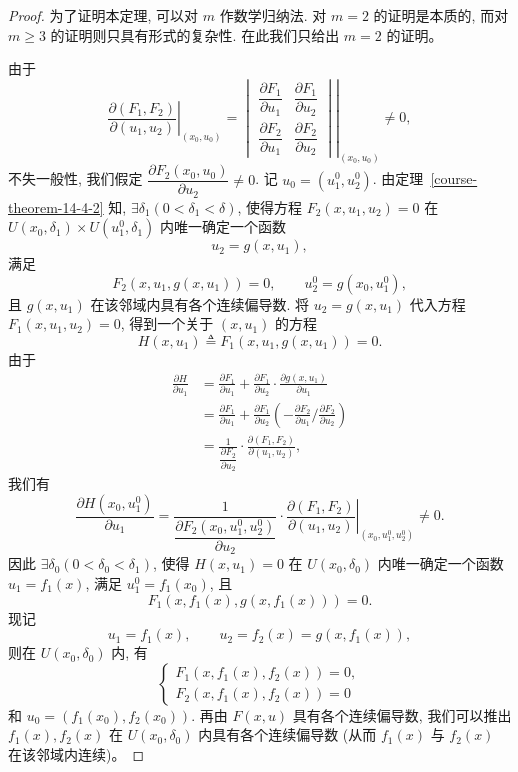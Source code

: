 \documentclass[12pt,fontset=fandol]{ctexart}
\begin{document}
\begin{proof}\quad 为了证明本定理, 可以对 $m$ 作数学归纳法. 对 $m=2$ 的证明是本质的, 而对 $m\geqslant3$ 的证明则只具有形式的复杂性. 在此我们只给出 $m=2$ 的证明。

由于
\[
  \left.
  \frac{\partial(F_1,F_2)}{\partial(u_1,u_2)}
  \right|_{(x_0,u_0)}
  =
  \left.
  \begin{vmatrix}
    \dfrac{\partial F_1}{\partial u_1} &
    \dfrac{\partial F_1}{\partial u_2}\\
    \dfrac{\partial F_2}{\partial u_1} &
    \dfrac{\partial F_2}{\partial u_2}
  \end{vmatrix}
  \right|_{(x_0,u_0)}
  \ne0,
\]
不失一般性, 我们假定 $\dfrac{\partial F_2(x_0,u_0)}{\partial u_2}\ne0$. 记 $u_0=(u_1^0,u_2^0)$. 由定理~\ref{course-theorem-14-4-2}  知, $\exists\delta_1(0<\delta_1<\delta)$, 使得方程 $F_2(x,u_1,u_2)=0$ 在 $U(x_0,\delta_1)\times U(u_1^0,\delta_1)$ 内唯一确定一个函数
\[
  u_2=g(x,u_1),
\]
满足
\[
  F_2(x,u_1,g(x,u_1))=0,\qquad u_2^0=g(x_0,u_1^0),
\]
且 $g(x,u_1)$ 在该邻域内具有各个连续偏导数. 将 $u_2=g(x,u_1)$ 代入方程 $F_1(x,u_1,u_2)=0$, 得到一个关于 $(x,u_1)$ 的方程
\[
  H(x,u_1)\triangleq F_1(x,u_1,g(x,u_1))=0.
\]
由于
\[
\begin{aligned}
  \frac{\partial H}{\partial u_1}
  &=\frac{\partial F_1}{\partial u_1}
  +\frac{\partial F_1}{\partial u_2}\cdot
  \frac{\partial g(x,u_1)}{\partial u_1}\\
  &=\frac{\partial F_1}{\partial u_1}
  +\frac{\partial F_1}{\partial u_2}
  \left(-\frac{\partial F_2}{\partial u_1}\bigg/
  \frac{\partial F_2}{\partial u_2}\right)\\
  &=\frac1{\dfrac{\partial F_2}{\partial u_2}}\cdot
  \frac{\partial(F_1,F_2)}{\partial(u_1,u_2)},
\end{aligned}
\]
我们有
\[
  \frac{\partial H(x_0,u_1^0)}{\partial u_1}
  =\frac1{\dfrac{\partial F_2(x_0,u_1^0,u_2^0)}{\partial u_2}}\cdot
  \left.
  \frac{\partial(F_1,F_2)}{\partial(u_1,u_2)}
  \right|_{(x_0,u_1^0,u_2^0)}
  \ne0.
\]
因此 $\exists\delta_0(0<\delta_0<\delta_1)$, 使得 $H(x,u_1)=0$ 在 $U(x_0,\delta_0)$ 内唯一确定一个函数 $u_1=f_1(x)$, 满足 $u_1^0=f_1(x_0)$, 且
\[
  F_1(x,f_1(x),g(x,f_1(x)))=0.
\]
现记
\[
  u_1=f_1(x),\qquad u_2=f_2(x)=g(x,f_1(x)),
\]
则在 $U(x_0,\delta_0)$ 内, 有
\[
  \begin{cases}
    F_1(x,f_1(x),f_2(x))=0,\\
    F_2(x,f_1(x),f_2(x))=0
  \end{cases}
\]
和 $u_0=(f_1(x_0),f_2(x_0))$. 再由 $F(x,u)$ 具有各个连续偏导数, 我们可以推出 $f_1(x),f_2(x)$ 在 $U(x_0,\delta_0)$ 内具有各个连续偏导数 (从而 $f_1(x)$ 与 $f_2(x)$ 在该邻域内连续)。


\end{proof}
\end{document}
